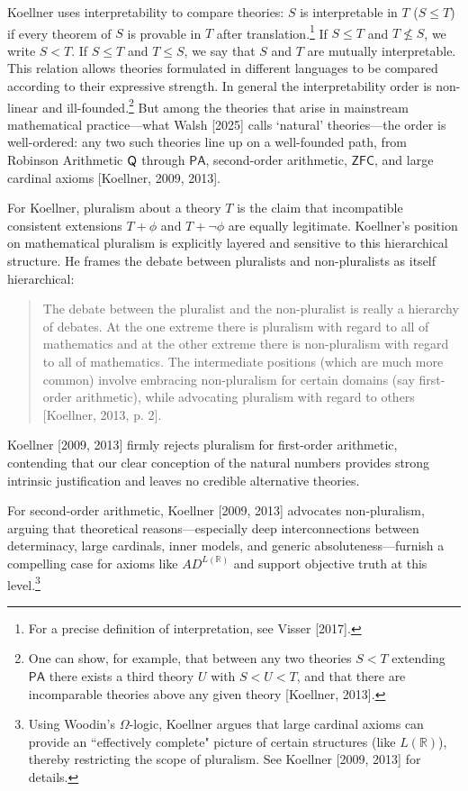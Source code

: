 \documentclass[a4paper,12pt]{amsart}
\theoremstyle{definition}
\numberwithin{equation}{section}
\begin{document}
Koellner uses interpretability to compare theories: \(S\) is interpretable in \(T\) (\(S \leq T\)) if every theorem of \(S\) is provable in \(T\) after translation.\footnote{For a precise definition of interpretation, see Visser [2017].} If $S\leq T$ and $T\nleqslant S$, we write $S< T$. If $S\leq T$ and $T\leq S$, we say that $S$ and $T$ are mutually interpretable. This relation allows theories formulated in different languages to be compared according to their expressive strength. In general the interpretability order is non-linear and ill-founded.\footnote{One can show, for example, that between any two theories $S < T$ extending $\mathsf{PA}$ there exists a third theory $U$ with $S < U < T$, and that there are incomparable theories above any given theory [Koellner, 2013].} But among the theories that arise in mainstream mathematical practice—what Walsh [2025] calls `natural' theories—the order is well-ordered: any two such theories line up on a well-founded path, from Robinson Arithmetic $\sf Q$ through \(\mathsf{PA}\), second-order arithmetic, \(\mathsf{ZFC}\), and large cardinal axioms [Koellner, 2009, 2013].


For Koellner, pluralism about a theory \(T\) is the claim that incompatible consistent extensions \(T+\phi\) and \(T+\neg\phi\) are equally legitimate. Koellner's position on mathematical pluralism is explicitly layered and sensitive to this hierarchical structure.
He  frames the debate between pluralists and non-pluralists as itself hierarchical: 
\begin{quote}
The debate between the pluralist and the non-pluralist is really a hierarchy of debates. At the one extreme there is pluralism with regard to all
of mathematics and at the other extreme there is non-pluralism with regard to all of mathematics. The intermediate positions (which are much more common) involve embracing non-pluralism for certain domains (say first-order arithmetic), while advocating pluralism with regard to others [Koellner, 2013, p. 2].
\end{quote}

Koellner [2009, 2013] firmly rejects pluralism for first-order arithmetic, contending that our clear conception of the natural numbers provides strong intrinsic justification and leaves no credible alternative theories.


For second-order arithmetic, Koellner [2009, 2013] advocates non-pluralism, arguing that theoretical reasons—especially deep interconnections between determinacy, large cardinals, inner models, and generic absoluteness—furnish a compelling case for axioms like $AD^{L(\mathbb{R})}$ and support objective truth at this level.\footnote{Using Woodin's $\Omega$-logic, Koellner argues that large cardinal axioms can provide an ``effectively complete" picture of certain structures (like $L(\mathbb{R})$), thereby restricting the scope of pluralism. See Koellner [2009, 2013] for details.} 
\end{document}
